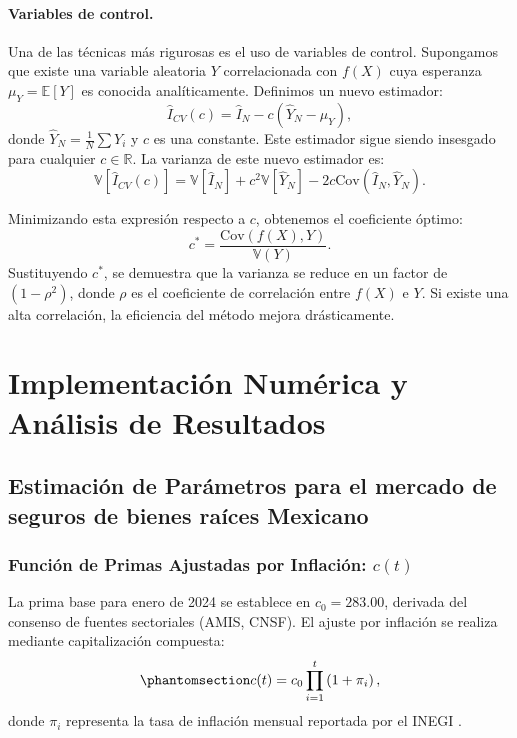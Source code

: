 \documentclass[
  spanish,
  us-letterpaper,
]{scrreprt}
\theoremstyle{plain}
\theoremstyle{plain}
\theoremstyle{definition}
\theoremstyle{remark}
\begin{document}
\subsubsection{Variables de control.}\label{variables-de-control.}

Una de las técnicas más rigurosas es el uso de variables de control.
Supongamos que existe una variable aleatoria \(Y\) correlacionada con
\(f(X)\) cuya esperanza \(\mu_Y = \mathbb{E}[Y]\) es conocida
analíticamente. Definimos un nuevo estimador:
\[\hat{I}_{CV}(c) = \hat{I}_N - c(\hat{Y}_N - \mu_Y),\] donde
\(\hat{Y}_N = \frac{1}{N}\sum Y_i\) y \(c\) es una constante. Este
estimador sigue siendo insesgado para cualquier \(c \in \mathbb{R}\). La
varianza de este nuevo estimador es:
\[\mathbb{V}[\hat{I}_{CV}(c)] = \mathbb{V}[\hat{I}_N] + c^2 \mathbb{V}[\hat{Y}_N] - 2c \text{Cov}(\hat{I}_N, \hat{Y}_N).\]

Minimizando esta expresión respecto a \(c\), obtenemos el coeficiente
óptimo: \[c^* = \frac{\text{Cov}(f(X), Y)}{\mathbb{V}(Y)}.\]
Sustituyendo \(c^*\), se demuestra que la varianza se reduce en un
factor de \((1 - \rho^2)\), donde \(\rho\) es el coeficiente de
correlación entre \(f(X)\) e \(Y\). Si existe una alta correlación, la
eficiencia del método mejora drásticamente.


\chapter{Implementación Numérica y Análisis de
Resultados}\label{implementaciuxf3n-numuxe9rica-y-anuxe1lisis-de-resultados}

\section{Estimación de Parámetros para el mercado de seguros de bienes
raíces
Mexicano}\label{estimaciuxf3n-de-paruxe1metros-para-el-mercado-de-seguros-de-bienes-rauxedces-mexicano}

\subsection{\texorpdfstring{Función de Primas Ajustadas por Inflación:
\(c(t)\)}{Función de Primas Ajustadas por Inflación: c(t)}}\label{funciuxf3n-de-primas-ajustadas-por-inflaciuxf3n-ct}

La prima base para enero de 2024 se establece en \(c_0 = 283.00\),
derivada del consenso de fuentes sectoriales (AMIS, CNSF). El ajuste por
inflación se realiza mediante capitalización compuesta:
\begin{equation}\protect\phantomsection\label{eq-ajuste_inflacion}{
 c(t) = c_0 \prod_{i=1}^{t} \left(1 + \pi_i\right),
 }\end{equation} donde \(\pi_i\) representa la tasa de inflación mensual
reportada por el INEGI \textcite{inegi2024inpc}.
\end{document}
